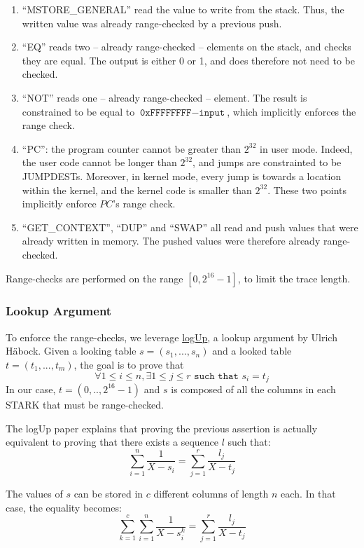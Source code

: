 \begin{enumerate}
  \item ``MSTORE\_GENERAL'' read the value to write from the stack. Thus, the written value was already range-checked by a previous push.
  \item ``EQ'' reads two -- already range-checked -- elements on the stack, and checks they are equal. The output is either 0 or 1, and does therefore not need to be checked.
  \item ``NOT'' reads one -- already range-checked -- element. The result is constrained to be equal to $\texttt{0xFFFFFFFF} - \texttt{input}$, which implicitly enforces the range check.
  \item ``PC'': the program counter cannot be greater than $2^{32}$ in user mode. Indeed, the user code cannot be longer than $2^{32}$, and jumps are constrainted to be JUMPDESTs. Moreover, in kernel mode, every jump is towards a location within the kernel, and the kernel code is smaller than $2^{32}$. These two points implicitly enforce $PC$'s range check.
  \item ``GET\_CONTEXT'', ``DUP'' and ``SWAP'' all read and push values that were already written in memory. The pushed values were therefore already range-checked.
\end{enumerate}
Range-checks are performed on the range $[0, 2^{16} - 1]$, to limit the trace length.

\subsubsection{Lookup Argument}
To enforce the range-checks, we leverage \href{https://eprint.iacr.org/2022/1530.pdf}{logUp}, a lookup argument by Ulrich Häbock. Given a looking table $s = (s_1, ..., s_n)$ and a looked table $t = (t_1, ..., t_m)$, the goal is to prove that 
$$\forall 1 \leq i \leq n, \exists 1 \leq j \leq r \texttt{ such that } s_i = t_j$$
In our case, $t = (0, .., 2^{16} - 1)$ and $s$ is composed of all the columns in each STARK that must be range-checked. 

The logUp paper explains that proving the previous assertion is actually equivalent to proving that there exists a sequence $l$ such that:
$$ \sum_{i=1}^n \frac{1}{X - s_i} = \sum_{j=1}^r \frac{l_j}{X-t_j}$$

The values of $s$ can be stored in $c$ different columns of length $n$ each. In that case, the equality becomes:
$$\sum_{k=1}^c \sum_{i=1}^n \frac{1}{X - s_i^k} = \sum_{j=1}^r \frac{l_j}{X-t_j}$$

